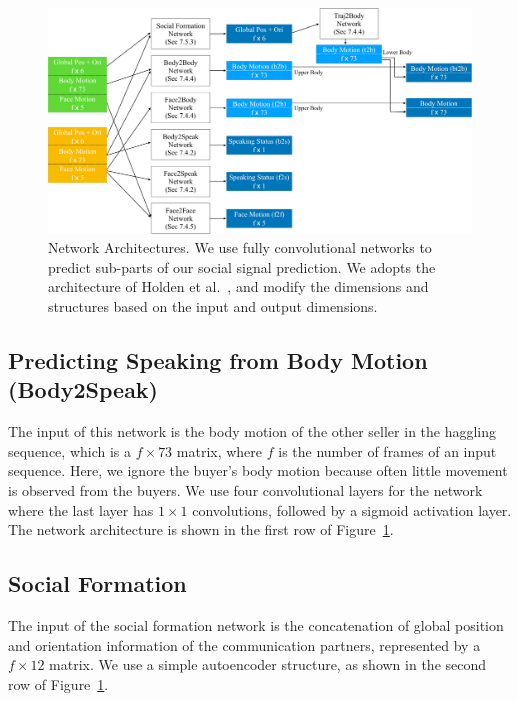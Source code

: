 \begin{figure}[t]	
	\includegraphics[width=\textwidth]{ssp_fig/networks_all}
	\caption{Network Architectures. We use fully convolutional networks to predict sub-parts of our social signal prediction. We adopts the architecture of Holden et al.~\cite{holden2016deep}, and modify the dimensions and structures based on the input and output dimensions. }
	\label{fig:architectures}
\end{figure}



\subsection{Predicting Speaking from Body Motion (Body2Speak)}
The input of this network is the body motion of the other seller in the haggling sequence, which is a $f \times 73$ matrix, where $f$ is the number of frames of an input sequence. Here, we ignore the buyer's body motion because often little movement is observed from the buyers.  We use four convolutional layers for the network where the last layer has $1\times1$ convolutions, followed by a sigmoid activation layer. The network architecture is shown in the first row of Figure~\ref{fig:architectures}.


\subsection{Social Formation}
The input of the social formation network is the concatenation of global position and orientation information of the communication partners, represented by a $f \times 12$ matrix.  We use a simple autoencoder structure, as shown in the second row of Figure~\ref{fig:architectures}.

